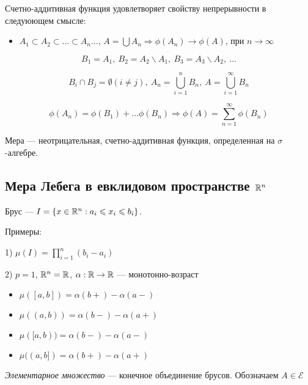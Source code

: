 Счетно-аддитивная функция удовлетворяет свойству непрерывности в следуюющем смысле:

\begin{itemize}
  \item $A_1 \subset A_2 \subset \dots \subset A_n \dots$, $A = \bigcup A_n \Rightarrow \phi(A_n)\to \phi(A)$, при $n \to \infty$
\end{itemize}

$$B_1 = A_1,\ B_2 = A_2 \backslash A_1,\ B_3 = A_3 \backslash A_2,\ \dots$$

$$B_i \cap B_j = \emptyset (i \ne j),\ A_n = \bigcup_{i = 1}^{n} B_n,\ A = \bigcup_{i=1}^{\infty} B_n$$

$$\phi(A_n) = \phi(B_1) + \dots \phi(B_n) \Rightarrow \phi(A) = \sum_{n = 1}^{\infty} \phi(B_n)$$


\begin{definition}
  Мера --- неотрицательная, счетно-аддитивная функция, определенная на $\sigma$-алгебре.
\end{definition}




\subsection{Мера Лебега в евклидовом пространстве $\mathbb{R}^n$}

\begin{definition}
  Брус --- $I = \left\{x \in \mathbb{R}^n : a_i \leqslant x_i \leqslant b_i \right\}$.
\end{definition}

Примеры:

1) $\mu(I) = \prod_{i = 1}^{n} (b_i - a_i)$

2) $p = 1$, $\mathbb{R}^n = \mathbb{R}$, $\alpha : \mathbb{R} \to \mathbb{R}$ --- монотонно-возраст

\begin{itemize}
  \item $\mu([a, b]) = \alpha(b+) - \alpha(a-)$
  \item $\mu((a, b)) = \alpha(b-) - \alpha(a+)$
  \item $\mu([a, b)) = \alpha(b-) - \alpha(a-)$
  \item $\mu((a, b]) = \alpha(b+) - \alpha(a+)$
\end{itemize}

\begin{definition}
  \textit{Элементарное множество} --- конечное объединение брусов. Обозначаем $A \in \mathcal{E}$
\end{definition}


